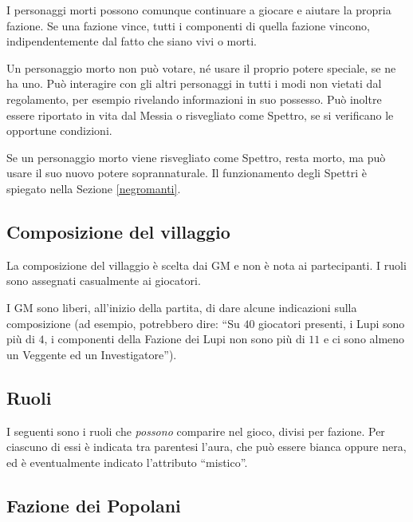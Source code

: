 \documentclass[a4paper,10pt]{article}
\begin{document}
I personaggi morti possono comunque continuare a giocare e aiutare la propria fazione.
Se una fazione vince, tutti i componenti di quella fazione vincono,
indipendentemente dal fatto che siano vivi o morti.

Un personaggio morto non può votare, né usare il proprio potere speciale, se ne
ha uno. Può interagire con gli altri personaggi in tutti i modi non vietati dal
regolamento, per esempio rivelando informazioni in suo possesso. Può inoltre
essere riportato in vita dal Messia o risvegliato come Spettro, se si verificano
le opportune condizioni.

Se un personaggio morto viene risvegliato come Spettro, resta morto, ma può
usare il suo nuovo potere soprannaturale. Il funzionamento degli Spettri è
spiegato nella Sezione \ref{negromanti}.


\subsection{Composizione del villaggio}
 
La composizione del villaggio è scelta dai GM e non è nota ai partecipanti. I
ruoli sono assegnati casualmente ai giocatori.

I GM sono liberi, all'inizio della partita, di dare alcune indicazioni sulla
composizione (ad esempio, potrebbero dire: ``Su $40$ giocatori presenti, i Lupi
sono più di $4$, i componenti della Fazione dei Lupi non sono più di $11$ e ci
sono almeno un Veggente ed un Investigatore'').


\subsection{Ruoli}
\label{ruoli}


I seguenti sono i ruoli che \emph{possono} comparire nel gioco, divisi per
fazione.
Per ciascuno di essi è indicata tra parentesi l'aura, che può essere bianca
oppure nera, ed è eventualmente indicato l'attributo ``mistico''.


\subsection*{Fazione dei Popolani}
\end{document}
